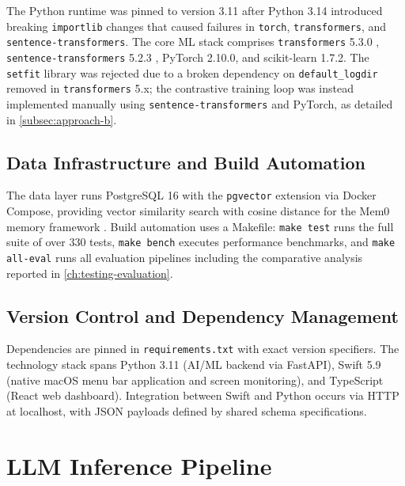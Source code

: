 The Python runtime was pinned to version 3.11 after Python 3.14 introduced breaking \texttt{importlib} changes that caused failures in \texttt{torch}, \texttt{transformers}, and \texttt{sentence-transformers}. The core ML stack comprises \texttt{transformers} 5.3.0 \cite{yang2025}, \texttt{sentence-transformers} 5.2.3 \cite{reimers2019}, PyTorch 2.10.0, and scikit-learn 1.7.2. The \texttt{setfit} library was rejected due to a broken dependency on \texttt{default\_logdir} removed in \texttt{transformers} 5.x; the contrastive training loop was instead implemented manually using \texttt{sentence-transformers} and PyTorch, as detailed in \cref{subsec:approach-b}.

\subsection{Data Infrastructure and Build Automation}
\label{subsec:data-infrastructure}

The data layer runs PostgreSQL 16 with the \texttt{pgvector} extension via Docker Compose, providing vector similarity search with cosine distance for the Mem0 memory framework \cite{chhikara2025}. Build automation uses a Makefile: \texttt{make test} runs the full suite of over 330 tests, \texttt{make bench} executes performance benchmarks, and \texttt{make all-eval} runs all evaluation pipelines including the comparative analysis reported in \cref{ch:testing-evaluation}.

\subsection{Version Control and Dependency Management}
\label{subsec:version-control}

Dependencies are pinned in \texttt{requirements.txt} with exact version specifiers. The technology stack spans Python 3.11 (AI/ML backend via FastAPI), Swift 5.9 (native macOS menu bar application and screen monitoring), and TypeScript (React web dashboard). Integration between Swift and Python occurs via HTTP at localhost, with JSON payloads defined by shared schema specifications.

\section{LLM Inference Pipeline}
\label{sec:llm-pipeline}

